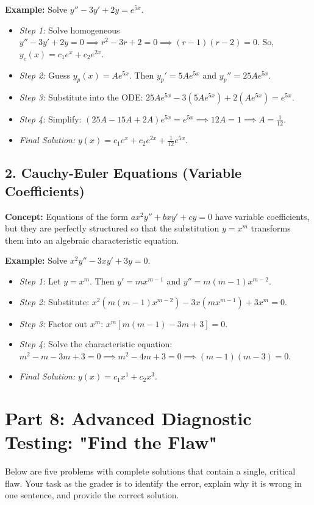 \documentclass[11pt, a4paper]{article}
\theoremstyle{definition}
\theoremstyle{remark}
\begin{document}
\textbf{Example:} Solve $y'' - 3y' + 2y = e^{5x}$.
\begin{itemize}
    \item \textit{Step 1:} Solve homogeneous $y'' - 3y' + 2y = 0 \implies r^2 - 3r + 2 = 0 \implies (r-1)(r-2) = 0$. So, $y_c(x) = c_1 e^x + c_2 e^{2x}$.
    \item \textit{Step 2:} Guess $y_p(x) = A e^{5x}$. Then $y_p' = 5A e^{5x}$ and $y_p'' = 25A e^{5x}$.
    \item \textit{Step 3:} Substitute into the ODE: $25A e^{5x} - 3(5A e^{5x}) + 2(A e^{5x}) = e^{5x}$.
    \item \textit{Step 4:} Simplify: $(25A - 15A + 2A)e^{5x} = e^{5x} \implies 12A = 1 \implies A = \frac{1}{12}$.
    \item \textit{Final Solution:} $y(x) = c_1 e^x + c_2 e^{2x} + \frac{1}{12} e^{5x}$.
\end{itemize}

\subsection{2. Cauchy-Euler Equations (Variable Coefficients)}
\textbf{Concept:} Equations of the form $a x^2 y'' + b x y' + c y = 0$ have variable coefficients, but they are perfectly structured so that the substitution $y = x^m$ transforms them into an algebraic characteristic equation.

\textbf{Example:} Solve $x^2 y'' - 3x y' + 3y = 0$.
\begin{itemize}
    \item \textit{Step 1:} Let $y = x^m$. Then $y' = m x^{m-1}$ and $y'' = m(m-1)x^{m-2}$.
    \item \textit{Step 2:} Substitute: $x^2(m(m-1)x^{m-2}) - 3x(m x^{m-1}) + 3x^m = 0$.
    \item \textit{Step 3:} Factor out $x^m$: $x^m [m(m-1) - 3m + 3] = 0$.
    \item \textit{Step 4:} Solve the characteristic equation: $m^2 - m - 3m + 3 = 0 \implies m^2 - 4m + 3 = 0 \implies (m-1)(m-3) = 0$.
    \item \textit{Final Solution:} $y(x) = c_1 x^1 + c_2 x^3$.
\end{itemize}

\newpage
\section{Part 8: Advanced Diagnostic Testing: "Find the Flaw"}

Below are five problems with complete solutions that contain a single, critical flaw. Your task as the grader is to identify the error, explain why it is wrong in one sentence, and provide the correct solution.
\end{document}
